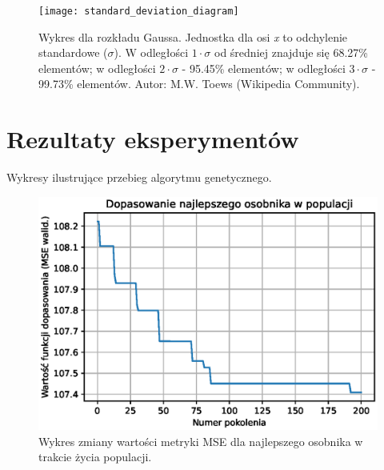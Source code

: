 \documentclass[a4paper,11pt]{article}
\begin{document}
    \bigskip

    \begin{figure}[H]
        \label{fig:standard_deviation_diagram}
        \centering
        \texttt{[image: standard\_deviation\_diagram]}
        \caption{Wykres dla rozkładu Gaussa. Jednostka dla osi \textit{x} to odchylenie standardowe ($\sigma$). W odległości $1 \cdot \sigma$ od średniej znajduje się 68.27\% elementów; w odległości $2 \cdot \sigma$ - 95.45\% elementów; w odległości $3 \cdot \sigma$ - 99.73\% elementów. Autor: M.W. Toews (Wikipedia Community).}
    \end{figure}


    \section{Rezultaty eksperymentów}

    Wykresy ilustrujące przebieg algorytmu genetycznego.

    \begin{figure}[H]
        \label{fig:g_a_best_fitness}
        \centering
        \includegraphics[width=\textwidth]{g_a_best_fitness}
        \caption{Wykres zmiany wartości metryki MSE dla najlepszego osobnika w trakcie życia populacji.}
    \end{figure}

    \bigskip
\end{document}
